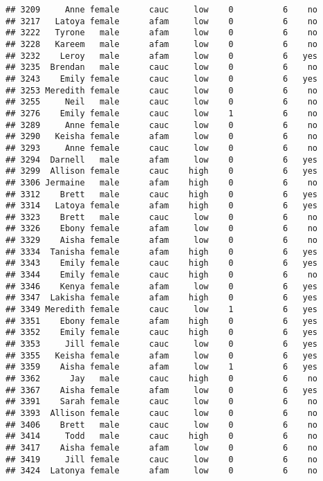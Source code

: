 \documentclass[
]{article}
\begin{document}
\begin{verbatim}
## 3209     Anne female      cauc     low    0          6    no
## 3217   Latoya female      afam     low    0          6    no
## 3222   Tyrone   male      afam     low    0          6    no
## 3228   Kareem   male      afam     low    0          6    no
## 3232    Leroy   male      afam     low    0          6   yes
## 3235  Brendan   male      cauc     low    0          6    no
## 3243    Emily female      cauc     low    0          6   yes
## 3253 Meredith female      cauc     low    0          6    no
## 3255     Neil   male      cauc     low    0          6    no
## 3276    Emily female      cauc     low    1          6    no
## 3289     Anne female      cauc     low    0          6    no
## 3290   Keisha female      afam     low    0          6    no
## 3293     Anne female      cauc     low    0          6    no
## 3294  Darnell   male      afam     low    0          6   yes
## 3299  Allison female      cauc    high    0          6   yes
## 3306 Jermaine   male      afam    high    0          6    no
## 3312    Brett   male      cauc    high    0          6   yes
## 3314   Latoya female      afam    high    0          6   yes
## 3323    Brett   male      cauc     low    0          6    no
## 3326    Ebony female      afam     low    0          6    no
## 3329    Aisha female      afam     low    0          6    no
## 3334  Tanisha female      afam    high    0          6   yes
## 3343    Emily female      cauc    high    0          6   yes
## 3344    Emily female      cauc    high    0          6    no
## 3346    Kenya female      afam     low    0          6   yes
## 3347  Lakisha female      afam    high    0          6   yes
## 3349 Meredith female      cauc     low    1          6   yes
## 3351    Ebony female      afam    high    0          6   yes
## 3352    Emily female      cauc    high    0          6   yes
## 3353     Jill female      cauc     low    0          6   yes
## 3355   Keisha female      afam     low    0          6   yes
## 3359    Aisha female      afam     low    1          6   yes
## 3362      Jay   male      cauc    high    0          6    no
## 3367    Aisha female      afam     low    0          6   yes
## 3391    Sarah female      cauc     low    0          6    no
## 3393  Allison female      cauc     low    0          6    no
## 3406    Brett   male      cauc     low    0          6    no
## 3414     Todd   male      cauc    high    0          6    no
## 3417    Aisha female      afam     low    0          6    no
## 3419     Jill female      cauc     low    0          6    no
## 3424  Latonya female      afam     low    0          6    no

\end{verbatim}
\end{document}
